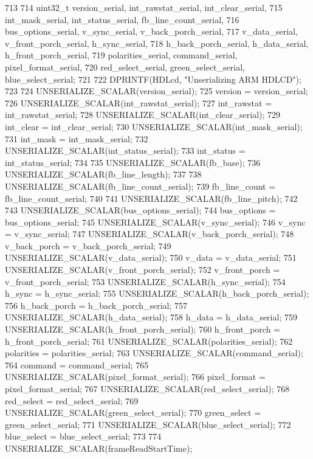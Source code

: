 \begin{DoxyCode}
713 {
714     uint32_t version_serial, int_rawstat_serial, int_clear_serial,
715             int_mask_serial, int_status_serial, fb_line_count_serial,
716             bus_options_serial, v_sync_serial, v_back_porch_serial,
717             v_data_serial, v_front_porch_serial, h_sync_serial,
718             h_back_porch_serial, h_data_serial, h_front_porch_serial,
719             polarities_serial, command_serial, pixel_format_serial,
720             red_select_serial, green_select_serial, blue_select_serial;
721 
722     DPRINTF(HDLcd, "Unserializing ARM HDLCD\n");
723 
724     UNSERIALIZE_SCALAR(version_serial);
725     version = version_serial;
726     UNSERIALIZE_SCALAR(int_rawstat_serial);
727     int_rawstat = int_rawstat_serial;
728     UNSERIALIZE_SCALAR(int_clear_serial);
729     int_clear = int_clear_serial;
730     UNSERIALIZE_SCALAR(int_mask_serial);
731     int_mask = int_mask_serial;
732     UNSERIALIZE_SCALAR(int_status_serial);
733     int_status = int_status_serial;
734 
735     UNSERIALIZE_SCALAR(fb_base);
736     UNSERIALIZE_SCALAR(fb_line_length);
737 
738     UNSERIALIZE_SCALAR(fb_line_count_serial);
739     fb_line_count = fb_line_count_serial;
740 
741     UNSERIALIZE_SCALAR(fb_line_pitch);
742 
743     UNSERIALIZE_SCALAR(bus_options_serial);
744     bus_options = bus_options_serial;
745     UNSERIALIZE_SCALAR(v_sync_serial);
746     v_sync = v_sync_serial;
747     UNSERIALIZE_SCALAR(v_back_porch_serial);
748     v_back_porch = v_back_porch_serial;
749     UNSERIALIZE_SCALAR(v_data_serial);
750     v_data = v_data_serial;
751     UNSERIALIZE_SCALAR(v_front_porch_serial);
752     v_front_porch = v_front_porch_serial;
753     UNSERIALIZE_SCALAR(h_sync_serial);
754     h_sync = h_sync_serial;
755     UNSERIALIZE_SCALAR(h_back_porch_serial);
756     h_back_porch = h_back_porch_serial;
757     UNSERIALIZE_SCALAR(h_data_serial);
758     h_data = h_data_serial;
759     UNSERIALIZE_SCALAR(h_front_porch_serial);
760     h_front_porch = h_front_porch_serial;
761     UNSERIALIZE_SCALAR(polarities_serial);
762     polarities = polarities_serial;
763     UNSERIALIZE_SCALAR(command_serial);
764     command = command_serial;
765     UNSERIALIZE_SCALAR(pixel_format_serial);
766     pixel_format = pixel_format_serial;
767     UNSERIALIZE_SCALAR(red_select_serial);
768     red_select = red_select_serial;
769     UNSERIALIZE_SCALAR(green_select_serial);
770     green_select = green_select_serial;
771     UNSERIALIZE_SCALAR(blue_select_serial);
772     blue_select = blue_select_serial;
773 
774     UNSERIALIZE_SCALAR(frameReadStartTime);
}
\end{DoxyCode}
